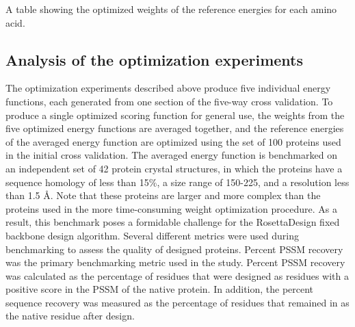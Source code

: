 \begin{table}
\scriptsize
\renewcommand{\tabcolsep}{0.09cm}
\centering

\caption{A table showing the optimized weights of the reference energies for each amino acid. }
\label{table:ref_energy_weights}
\end{table}

\subsection{Analysis of the optimization experiments}
The optimization experiments described above produce five individual energy functions, each generated from one section of the five-way cross validation.
To produce a single optimized scoring function for general use, the weights from the five optimized energy functions are averaged together, and the reference energies of the averaged energy function are optimized using the set of 100 proteins used in the initial  cross validation.
The averaged energy function is benchmarked on an independent set of 42 protein crystal structures, in which the proteins have a sequence homology of less than 15\%, a size range of 150-225, and a resolution less than 1.5 \AA.
Note that these proteins are larger and more complex than the proteins used in the more time-consuming weight optimization procedure.
As a result, this benchmark poses a formidable challenge for the RosettaDesign fixed backbone design algorithm.
Several different metrics were used during benchmarking to assess the quality of designed proteins.
Percent \ac{PSSM} recovery was the primary benchmarking metric used in the study.
Percent \ac{PSSM} recovery was calculated as the percentage of residues that were designed as residues with a positive score in the \ac{PSSM} of the native protein.
In addition, the percent sequence recovery was measured as the percentage of residues that remained in as the native residue after design. 

